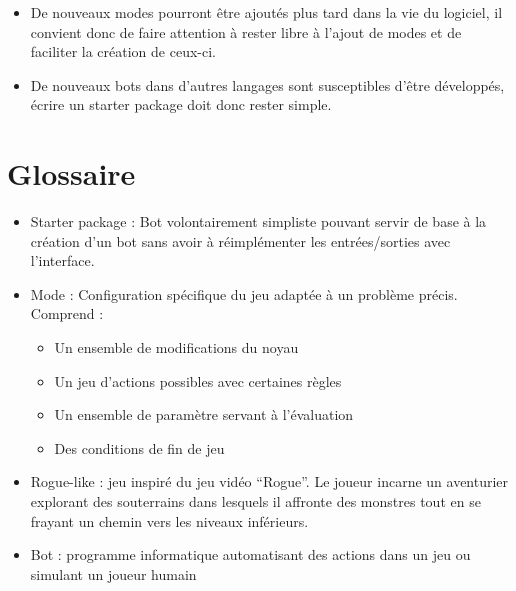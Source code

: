 \documentclass[12pt]{article}
\begin{document}
\begin{itemize}
\item De nouveaux modes pourront être ajoutés plus tard dans la vie du logiciel, il convient donc de faire attention à rester libre à l'ajout de modes et de faciliter la création de ceux-ci.
\item De nouveaux bots dans d'autres langages sont susceptibles d'être développés, écrire un starter package doit donc rester simple.
\end{itemize}

\section{Glossaire}

\begin{itemize}
	\item Starter package : Bot volontairement simpliste pouvant servir de base à la création d'un bot sans avoir à réimplémenter les entrées/sorties avec l'interface.
	\item Mode : Configuration spécifique du jeu adaptée à un problème précis. Comprend :
  	\begin{itemize}
		\item Un ensemble de modifications du noyau
		\item Un jeu d'actions possibles avec certaines règles
		\item Un ensemble de paramètre servant à l'évaluation
		\item Des conditions de fin de jeu
  	\end{itemize}
	\item Rogue-like : jeu inspiré du jeu vidéo ``Rogue''. Le joueur incarne un aventurier explorant des souterrains dans lesquels il affronte des monstres tout en se frayant un chemin vers les niveaux inférieurs.
	\item Bot : programme informatique automatisant des actions dans un jeu ou simulant un joueur humain
\end{itemize}
\end{document}
